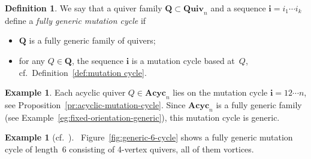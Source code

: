 \documentclass[11pt, letterpaper]{amsart}
\theoremstyle{definition}
\newtheorem{example}[theorem]{Example}
\newtheorem{definition}[theorem]{Definition}
\numberwithin{equation}{section}
\def\Quiv {{\mathbf{Quiv}}}
\begin{document}
\begin{definition}
\label{def:generic-mut-cycle}
We say that a quiver family 
$\mathbf{Q}\subset\Quiv_n$ and a sequence $\mathbf{i}=i_1\cdots i_k$ define a \emph{fully generic mutation cycle} if
\begin{itemize}[leftmargin=.2in]
\item 
$\mathbf{Q}$ is a fully generic family of quivers; 
\item
for any $Q\in\mathbf{Q}$, the sequence $\mathbf{i}$ is a mutation cycle based at~$Q$, cf.\ Definition~\ref{def:mutation cycle}. 
\end{itemize}
\end{definition}

\begin{example}
\label{eg:acyclic-generic-cycle}
Each acyclic quiver $Q\in\mathbf{Acyc}_n$ lies on the mutation cycle $\mathbf{i}=12\cdots n$, 
see Proposition~\ref{pr:acyclic-mutation-cycle}.
Since $\mathbf{Acyc}_n$ is a fully generic family (see Example~\ref{eg:fixed-orientation-generic}),
this mutation cycle is generic. 
\end{example}

\begin{example}[{cf.\ \cite[Example~12.30]{Warkentin}}]
\label{eg:6-cycle-vortices}\
Figure~\ref{fig:generic-6-cycle} shows a fully generic mutation cycle of length~6 consisting
of 4-vertex quivers, all of them vortices. 
\end{example}


\newcommand{\sns}{-stealth}
\newcommand{\snsl}{stealth-} 
\end{document}
